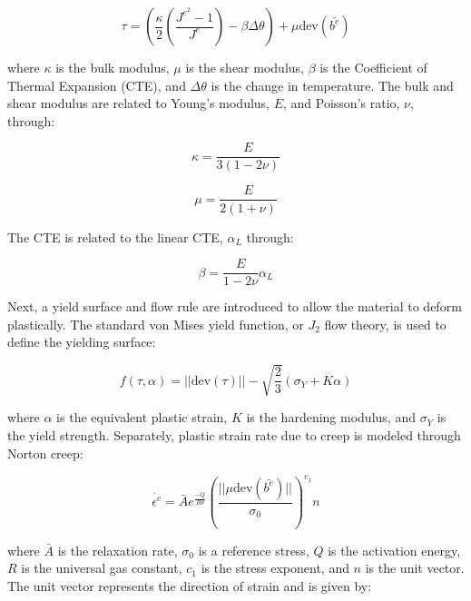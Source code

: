 \documentclass[conf]{new-aiaa}
\begin{document}
\begin{equation}
  \tau = \left( \frac{\kappa}{2} \left( \frac{J^{e^2} - 1}{J^e} \right) - \beta \Delta \theta \right) + \mu \text{dev}( \bar{b^e})
\end{equation}

\noindent
where $\kappa$ is the bulk modulus, 
$\mu$ is the shear modulus,
$\beta$ is the Coefficient of Thermal Expansion (CTE),
and
$\Delta \theta$ is the change in temperature.
The bulk and shear modulus are related to 
Young's modulus, $E$, and Poisson's ratio, $\nu$, through:

\begin{equation}
  \kappa = \frac{E}{3(1-2\nu)}
\end{equation}

\begin{equation}
  \mu = \frac{E}{2(1+\nu)}
\end{equation}

\noindent
The CTE is related to the linear CTE, $\alpha_L$ through:

\begin{equation}
  \beta = \frac{ E}{ 1-2\nu} \alpha_L
\end{equation}

Next, a yield surface and flow rule are introduced to allow the material 
to deform plastically.
The standard von Mises yield function, or $J_2$ flow theory, is used to 
define the yielding surface:

\begin{equation}
  f(\tau, \alpha) = || \text{dev}(\tau) || - \sqrt{\frac{2}{3}}( \sigma_Y + K \alpha)
\end{equation}

\noindent
where $\alpha$ is the equivalent plastic strain,
$K$ is the hardening modulus,
and $\sigma_Y$ is the yield strength.
Separately, plastic strain rate due to creep is modeled 
through Norton creep:


\begin{equation}
  \dot{\epsilon^c} = \bar{A} e^{\frac{-Q}{R \theta}} \left( \frac{ || \mu \text{dev}(\bar{b^e})||}{\sigma_0} \right)^{c_1} n
\label{eq_norton_creep}
\end{equation}

\noindent
where $\bar{A}$ is the relaxation rate, 
$\sigma_0$ is a reference stress,
$Q$ is the activation energy,
$R$ is the universal gas constant,
$c_1$ is the stress exponent,
and 
$n$ is the unit vector. 
The unit vector represents the direction of strain and is
given by:
\end{document}
